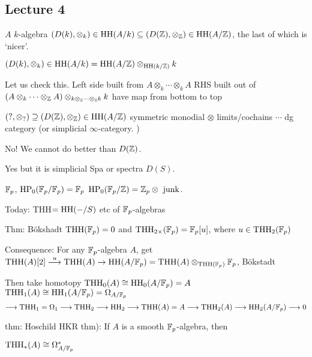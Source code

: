 \newpage
\subsection{Lecture 4}

$A$ $k$-algebra
$(D(k), \otimes_k) \in \hh(A/k) \subseteq (D(\Z), \otimes_\Z) \in \hh(A/\Z)$, the last of which is `nicer'. 

$(D(k), \otimes_k) \in \hh(A/k)= \hh(A/\Z) \otimes_{\hh(k/\Z)} k$

Let us check this. Left side built from $A \otimes_k \cdots \otimes_k A$
RHS built out of $(A \otimes_k \cdots \otimes_\Z A) \otimes_{k \otimes_\Z \cdots \otimes_\Z k} k$ have map from bottom to top


$(?,\otimes_?) \supseteq (D(\Z), \otimes_\Z) \in \hh(A/\Z) $
symmetric monodial $\otimes$
limits/cochains
$\cdots$
dg category (or simplicial $\infty$-category. )


No! We cannot do better than $D(\Z)$. 


Yes but it is simplicial Spa or spectra $D(S)$.

$\F_p$, $\hp_0(\F_p/\F_p)= \F_p$
$\hp_0(\F_p/\Z)= \Z_p \otimes \text{ junk}$. 


Today: THH$=\hh(-/S)$ etc of $\F_p$-algebras


Thm: B\"okshadt
$\thh(\F_p)=0$ and $\thh_{2 \times}(\F_p)= \F_p[u]$, where $u \in \thh_2(\F_p)$


Consequence: For any $\F_p$-algebra $A$, get $\thh(A)[2] \ma{u} \thh(A) \to \hh(A/\F_p)= \thh(A) \otimes_{\thh(\F_p)} \F_p$, B\"okstadt

Then take homotopy 
$\thh_0(A) \cong \hh_0(A/\F_p)= A$
$\thh_1(A) \cong \hh_1(A/\F_p)= \Omega_{A/\F_p}$
	\[
	\ma{} \thh_1=\Omega_1 \ma{} \thh_2 \ma{} \hh_2 \ma{} \thh(A)=A \ma{} \thh_2(A) \ma{} \hh_2(A/\F_p) \ma{} 0
	\]


thm: Hoschild HKR thm): If $A$ is a smooth $\F_p$-algebra, then 

$\thh_*(A) \cong \Omega_{A/\F_p}^*$






























